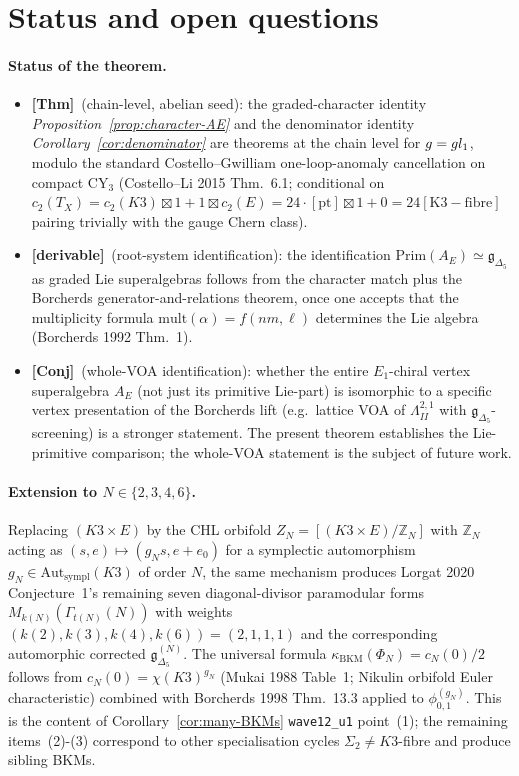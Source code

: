 \documentclass[11pt]{amsart}
\providecommand{\Z}{\mathbb{Z}}
\providecommand{\frakg}{\mathfrak{g}}
\providecommand{\gDelta}{\mathfrak{g}_{\Delta_5}}
\providecommand{\Lat}{\Lambda}
\providecommand{\Prim}{\mathrm{Prim}}
\providecommand{\mult}{\mathrm{mult}}
\providecommand{\kBKM}{\kappa_{\mathrm{BKM}}}
\providecommand{\ClaimStatusTheorem}{\textbf{[Thm]}}
\providecommand{\ClaimStatusDerivation}{\textbf{[derivable]}}
\providecommand{\ClaimStatusConjectured}{\textbf{[Conj]}}
\theoremstyle{plain}
\theoremstyle{definition}
\theoremstyle{remark}
\begin{document}
\section{Status and open questions}

\paragraph{Status of the theorem.}
\begin{itemize}[leftmargin=1.5em,itemsep=1pt]
\item \ClaimStatusTheorem\ (chain-level, abelian seed): the graded-character
identity \emph{Proposition~\ref{prop:character-AE}} and the
denominator identity \emph{Corollary~\ref{cor:denominator}} are
theorems at the chain level for $\frakg=\fgl_1$, modulo the
standard Costello--Gwilliam one-loop-anomaly cancellation on compact
CY$_3$ (Costello--Li 2015 Thm.~6.1; conditional on $c_2(T_X)=
c_2(K3)\boxtimes 1+1\boxtimes c_2(E)=24\cdot[\mathrm{pt}]\boxtimes 1+0
=24[\mathrm{K3-fibre}]$ pairing trivially with the gauge Chern class).
\item \ClaimStatusDerivation\ (root-system identification): the identification
$\Prim(A_E)\simeq\gDelta$ as graded Lie superalgebras follows from the
character match plus the Borcherds generator-and-relations theorem,
once one accepts that the multiplicity formula $\mult(\alpha)=
f(nm,\ell)$ determines the Lie algebra (Borcherds 1992 Thm.~1).
\item \ClaimStatusConjectured\ (whole-VOA identification): whether the
entire $E_1$-chiral vertex superalgebra $A_E$ (not just its
primitive Lie-part) is isomorphic to a specific vertex presentation
of the Borcherds lift (e.g.\ lattice VOA of $\Lat^{2,1}_{II}$
with $\gDelta$-screening) is a stronger statement. The present
theorem establishes the Lie-primitive comparison; the whole-VOA
statement is the subject of future work.
\end{itemize}

\paragraph{Extension to $N\in\{2,3,4,6\}$.} Replacing $(K3\times E)$ by
the CHL orbifold $Z_N=[(K3\times E)/\Z_N]$ with $\Z_N$ acting as
$(s,e)\mapsto(g_N s, e+e_0)$ for a symplectic automorphism $g_N\in
\mathrm{Aut}_{\mathrm{sympl}}(K3)$ of order $N$, the same mechanism
produces Lorgat 2020 Conjecture~1's remaining seven diagonal-divisor
paramodular forms $M_{k(N)}(\Gamma_{t(N)}(N))$ with weights
$(k(2),k(3),k(4),k(6))=(2,1,1,1)$ and the corresponding automorphic
corrected $\gDelta^{(N)}$. The universal formula $\kBKM(\Phi_N)=
c_N(0)/2$ follows from $c_N(0)=\chi(K3)^{g_N}$ (Mukai 1988 Table~1;
Nikulin orbifold Euler characteristic) combined with Borcherds 1998
Thm.~13.3 applied to $\phi^{(g_N)}_{0,1}$. This is the content of
Corollary~\ref{cor:many-BKMs} \texttt{wave12\_u1} point~(1); the remaining
items~(2)-(3) correspond to other specialisation cycles $\Sigma_2\neq
K3$-fibre and produce sibling BKMs.
\end{document}
